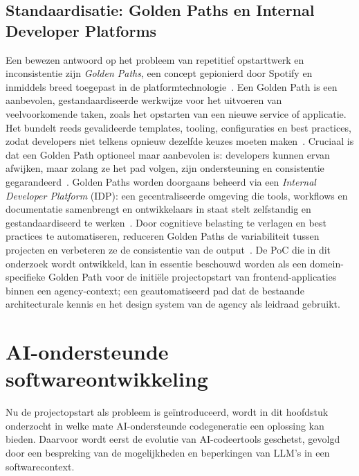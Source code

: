 \subsection{Standaardisatie: Golden Paths en Internal Developer Platforms}
\label{subsec:golden-paths}

Een bewezen antwoord op het probleem van repetitief opstarttwerk en inconsistentie zijn \textit{Golden Paths}, een concept gepionierd door Spotify en inmiddels breed toegepast in de platformtechnologie~\autocite{Pulumi2025}. Een Golden Path is een aanbevolen, gestandaardiseerde werkwijze voor het uitvoeren van veelvoorkomende taken, zoals het opstarten van een nieuwe service of applicatie. Het bundelt reeds gevalideerde templates, tooling, configuraties en best practices, zodat developers niet telkens opnieuw dezelfde keuzes moeten maken~\autocite{Jellyfish2025}. Cruciaal is dat een Golden Path optioneel maar aanbevolen is: developers kunnen ervan afwijken, maar zolang ze het pad volgen, zijn ondersteuning en consistentie gegarandeerd~\autocite{Pulumi2025}. Golden Paths worden doorgaans beheerd via een \textit{Internal Developer Platform} (IDP): een gecentraliseerde omgeving die tools, workflows en documentatie samenbrengt en ontwikkelaars in staat stelt zelfstandig en gestandaardiseerd te werken~\autocite{DigitalAI2026}. Door cognitieve belasting te verlagen en best practices te automatiseren, reduceren Golden Paths de variabiliteit tussen projecten en verbeteren ze de consistentie van de output~\autocite{RedHat2025}. De PoC die in dit onderzoek wordt ontwikkeld, kan in essentie beschouwd worden als een domein-specifieke Golden Path voor de initiële projectopstart van frontend-applicaties binnen een agency-context; een geautomatiseerd pad dat de bestaande architecturale kennis en het design system van de agency als leidraad gebruikt.

\section{AI-ondersteunde softwareontwikkeling}
\label{sec:ai-softwareontwikkeling}

Nu de projectopstart als probleem is geïntroduceerd, wordt in dit hoofdstuk onderzocht in welke mate AI-ondersteunde codegeneratie een oplossing kan bieden. Daarvoor wordt eerst de evolutie van AI-codeertools geschetst, gevolgd door een bespreking van de mogelijkheden en beperkingen van LLM's in een softwarecontext.

